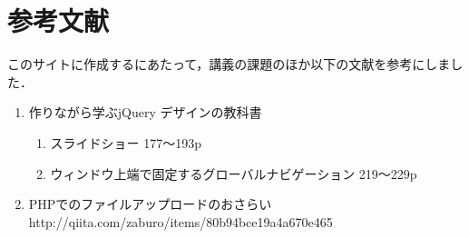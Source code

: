 
\section{参考文献}
このサイトに作成するにあたって，講義の課題のほか以下の文献を参考にしました．

\begin{enumerate}
\item 作りながら学ぶjQuery デザインの教科書
  \begin{enumerate}
  \item スライドショー 177〜193p
  \item ウィンドウ上端で固定するグローバルナビゲーション 219〜229p
  \end{enumerate}
  \item PHPでのファイルアップロードのおさらい http://qiita.com/zaburo/items/80b94bce19a4a670e465
\end{enumerate}
